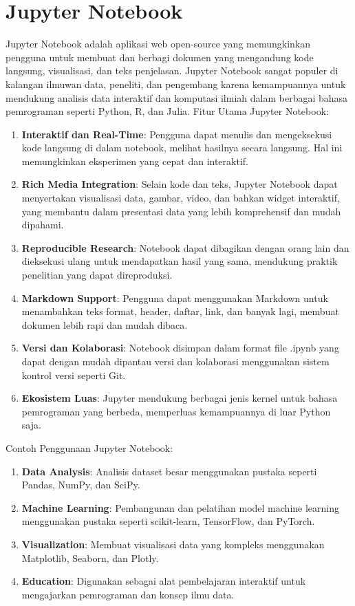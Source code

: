 \section{Jupyter Notebook}
Jupyter Notebook adalah aplikasi web open-source yang memungkinkan pengguna untuk membuat dan berbagi dokumen yang mengandung kode langsung, visualisasi, dan teks penjelasan. Jupyter Notebook sangat populer di kalangan ilmuwan data, peneliti, dan pengembang karena kemampuannya untuk mendukung analisis data interaktif dan komputasi ilmiah dalam berbagai bahasa pemrograman seperti Python, R, dan Julia. \cite{Jupyter2021}
Fitur Utama Jupyter Notebook:
\begin{enumerate}
    \item \textbf{Interaktif dan Real-Time}: Pengguna dapat menulis dan mengeksekusi kode langsung di dalam notebook, melihat hasilnya secara langsung. Hal ini memungkinkan eksperimen yang cepat dan interaktif.
    \item \textbf{Rich Media Integration}: Selain kode dan teks, Jupyter Notebook dapat menyertakan visualisasi data, gambar, video, dan bahkan widget interaktif, yang membantu dalam presentasi data yang lebih komprehensif dan mudah dipahami.
    \item \textbf{Reproducible Research}: Notebook dapat dibagikan dengan orang lain dan dieksekusi ulang untuk mendapatkan hasil yang sama, mendukung praktik penelitian yang dapat direproduksi.
    \item \textbf{Markdown Support}: Pengguna dapat menggunakan Markdown untuk menambahkan teks format, header, daftar, link, dan banyak lagi, membuat dokumen lebih rapi dan mudah dibaca.
    \item \textbf{Versi dan Kolaborasi}: Notebook disimpan dalam format file .ipynb yang dapat dengan mudah dipantau versi dan kolaborasi menggunakan sistem kontrol versi seperti Git.
    \item \textbf{Ekosistem Luas}: Jupyter mendukung berbagai jenis kernel untuk bahasa pemrograman yang berbeda, memperluas kemampuannya di luar Python saja.
\end{enumerate}

Contoh Penggunaan Jupyter Notebook: 
\begin{enumerate}
    \item \textbf{Data Analysis}: Analisis dataset besar menggunakan pustaka seperti Pandas, NumPy, dan SciPy.
    \item \textbf{Machine Learning}: Pembangunan dan pelatihan model machine learning menggunakan pustaka seperti scikit-learn, TensorFlow, dan PyTorch.
    \item \textbf{Visualization}: Membuat visualisasi data yang kompleks menggunakan Matplotlib, Seaborn, dan Plotly.
    \item \textbf{Education}: Digunakan sebagai alat pembelajaran interaktif untuk mengajarkan pemrograman dan konsep ilmu data.
\end{enumerate}

